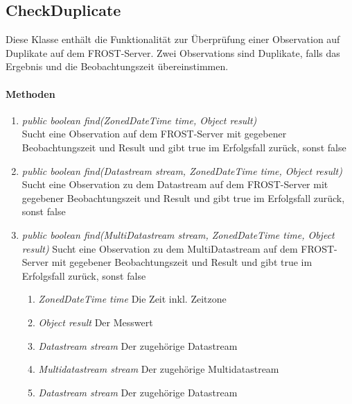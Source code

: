 \subsection{CheckDuplicate}

Diese Klasse enthält die Funktionalität zur Überprüfung einer Observation auf Duplikate auf dem FROST-Server.
Zwei Observations sind Duplikate, falls das Ergebnis und die Beobachtungszeit übereinstimmen.

\paragraph{Methoden}
	
	\begin{enumerate}[+]
\item \textit{public boolean find(ZonedDateTime time, Object result)} \\Sucht eine Observation auf dem FROST-Server mit gegebener Beobachtungszeit und Result und gibt true im Erfolgsfall zurück, sonst false
			
\item \textit{public boolean find(Datastream stream, ZonedDateTime time, Object result)} \\Sucht eine Observation zu dem Datastream auf dem FROST-Server mit gegebener Beobachtungszeit und Result und gibt true im Erfolgsfall zurück, sonst false

\item \textit{public boolean find(MultiDatastream stream, ZonedDateTime time, Object result)} Sucht eine Observation zu dem MultiDatastream auf dem FROST-Server mit gegebener Beobachtungszeit und Result und gibt true im Erfolgsfall zurück, sonst false


		\begin{enumerate}[$\bullet$]
			\item \textit{ZonedDateTime time} Die Zeit inkl. Zeitzone
			\item \textit{Object result} Der Messwert
			\item \textit{Datastream stream} Der zugehörige Datastream 
			\item \textit{Multidatastream stream} Der zugehörige Multidatastream
			\item \textit{Datastream stream} Der zugehörige Datastream 
		\end{enumerate}
		\vspace{-0.2cm}
\end{enumerate}